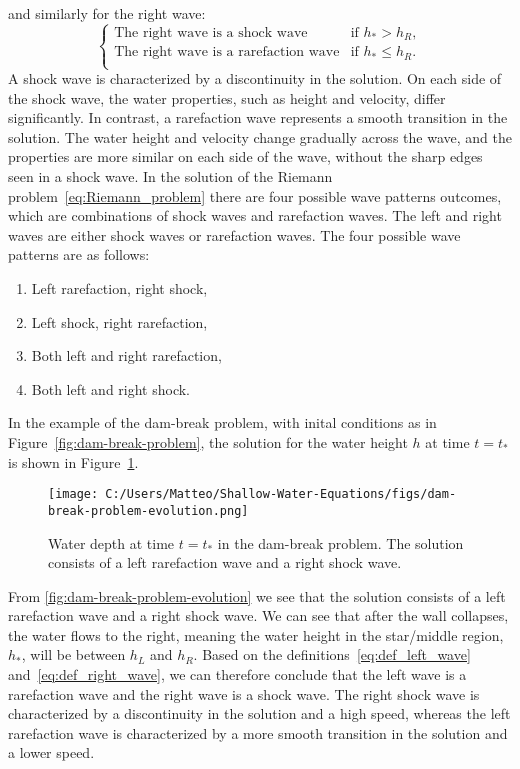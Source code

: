 and similarly for the right wave:
\begin{equation}\label{eq:def_right_wave}
    \begin{cases}
        \text{The right wave is a shock wave} & \text{if } h_* > h_R, \\
        \text{The right wave is a rarefaction wave} & \text{if } h_* \leq h_R. \\        
    \end{cases} 
\end{equation}
A shock wave is characterized by a discontinuity in the solution.
On each side of the shock wave, the water properties, such as height and velocity, differ significantly.
In contrast, a rarefaction wave represents a smooth transition in the solution.
The water height and velocity change gradually across the wave, and the properties are more similar on each side of the wave, without the sharp edges seen in a shock wave.
In the solution of the Riemann problem~\eqref{eq:Riemann_problem} there are four possible wave patterns outcomes, which are combinations of shock waves and rarefaction waves.
The left and right waves are either shock waves or rarefaction waves.
The four possible wave patterns are as follows:
\begin{enumerate}[label= (\alph*)]
    \item Left rarefaction, right shock,
    \item Left shock, right rarefaction,
    \item Both left and right rarefaction,
    \item Both left and right shock.
\end{enumerate}
In the example of the dam-break problem, with inital conditions as in Figure~\ref{fig:dam-break-problem}, the solution for the water height $h$ at time $t = t_*$ is shown in Figure~\ref{fig:dam-break-problem-evolution}.
\begin{figure}[H]
    \centering
    \texttt{[image: C:/Users/Matteo/Shallow-Water-Equations/figs/dam-break-problem-evolution.png]}
    \caption{Water depth at time $t = t_*$ in the dam-break problem. The solution consists of a left rarefaction wave and a right shock wave.}\label{fig:dam-break-problem-evolution}
\end{figure}
From \autoref{fig:dam-break-problem-evolution} we see that the solution consists of a left rarefaction wave and a right shock wave.
We can see that after the wall collapses, the water flows to the right, meaning the water height in the star/middle region, $h_*$, will be between $h_L$ and $h_R$.
Based on the definitions~\eqref{eq:def_left_wave} and~\eqref{eq:def_right_wave}, we can therefore conclude that the left wave is a rarefaction wave and the right wave is a shock wave.
The right shock wave is characterized by a discontinuity in the solution and a high speed, whereas the left rarefaction wave is characterized by a more smooth transition in the solution and a lower speed.

